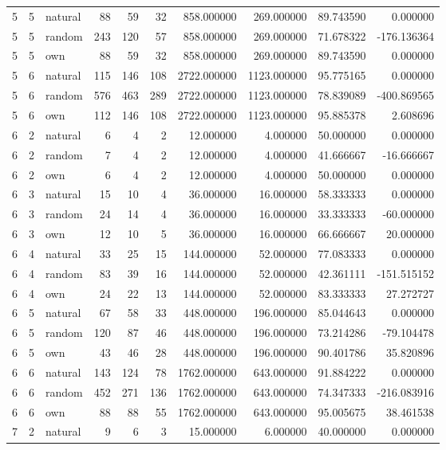 \begin{table}[htbp]
\begin{tabular}{rrlrrrrrrr}
5 & 5 & natural & 88 & 59 & 32 & 858.000000 & 269.000000 & 89.743590 & 0.000000 \\
5 & 5 & random & 243 & 120 & 57 & 858.000000 & 269.000000 & 71.678322 & -176.136364 \\
5 & 5 & own & 88 & 59 & 32 & 858.000000 & 269.000000 & 89.743590 & 0.000000 \\
5 & 6 & natural & 115 & 146 & 108 & 2722.000000 & 1123.000000 & 95.775165 & 0.000000 \\
5 & 6 & random & 576 & 463 & 289 & 2722.000000 & 1123.000000 & 78.839089 & -400.869565 \\
5 & 6 & own & 112 & 146 & 108 & 2722.000000 & 1123.000000 & 95.885378 & 2.608696 \\
6 & 2 & natural & 6 & 4 & 2 & 12.000000 & 4.000000 & 50.000000 & 0.000000 \\
6 & 2 & random & 7 & 4 & 2 & 12.000000 & 4.000000 & 41.666667 & -16.666667 \\
6 & 2 & own & 6 & 4 & 2 & 12.000000 & 4.000000 & 50.000000 & 0.000000 \\
6 & 3 & natural & 15 & 10 & 4 & 36.000000 & 16.000000 & 58.333333 & 0.000000 \\
6 & 3 & random & 24 & 14 & 4 & 36.000000 & 16.000000 & 33.333333 & -60.000000 \\
6 & 3 & own & 12 & 10 & 5 & 36.000000 & 16.000000 & 66.666667 & 20.000000 \\
6 & 4 & natural & 33 & 25 & 15 & 144.000000 & 52.000000 & 77.083333 & 0.000000 \\
6 & 4 & random & 83 & 39 & 16 & 144.000000 & 52.000000 & 42.361111 & -151.515152 \\
6 & 4 & own & 24 & 22 & 13 & 144.000000 & 52.000000 & 83.333333 & 27.272727 \\
6 & 5 & natural & 67 & 58 & 33 & 448.000000 & 196.000000 & 85.044643 & 0.000000 \\
6 & 5 & random & 120 & 87 & 46 & 448.000000 & 196.000000 & 73.214286 & -79.104478 \\
6 & 5 & own & 43 & 46 & 28 & 448.000000 & 196.000000 & 90.401786 & 35.820896 \\
6 & 6 & natural & 143 & 124 & 78 & 1762.000000 & 643.000000 & 91.884222 & 0.000000 \\
6 & 6 & random & 452 & 271 & 136 & 1762.000000 & 643.000000 & 74.347333 & -216.083916 \\
6 & 6 & own & 88 & 88 & 55 & 1762.000000 & 643.000000 & 95.005675 & 38.461538 \\
7 & 2 & natural & 9 & 6 & 3 & 15.000000 & 6.000000 & 40.000000 & 0.000000 \\

\end{tabular}
\end{table}

